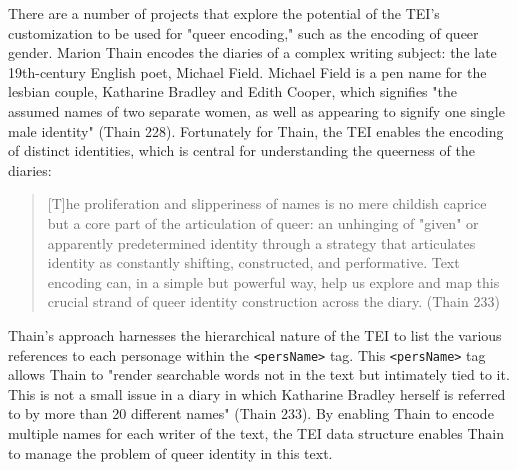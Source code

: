 \documentclass[11pt]{article}
\begin{document}
There are a number of projects that explore the potential of the TEI's
customization to be used for "queer encoding," such as the encoding of
queer gender. Marion Thain encodes the diaries of a complex writing
subject: the late 19th-century English poet, Michael Field. Michael
Field is a pen name for the lesbian couple, Katharine Bradley and
Edith Cooper, which signifies "the assumed names of two separate
women, as well as appearing to signify one single male identity"
(Thain 228). Fortunately for Thain, the TEI enables the encoding of
distinct identities, which is central for understanding the queerness
of the diaries:
\begin{quote}
[T]he proliferation and slipperiness of names is no mere childish
caprice but a core part of the articulation of queer: an unhinging of
"given" or apparently predetermined identity through a strategy that
articulates identity as constantly shifting, constructed, and
performative. Text encoding can, in a simple but powerful way, help us
explore and map this crucial strand of queer identity construction
across the diary. (Thain 233)
\end{quote}
Thain's approach harnesses the hierarchical nature of the TEI to list
the various references to each personage within the \texttt{<persName>} tag.
This \texttt{<persName>} tag allows Thain to "render searchable words not in
the text but intimately tied to it. This is not a small issue in a
diary in which Katharine Bradley herself is referred to by more than
20 different names" (Thain 233). By enabling Thain to encode multiple
names for each writer of the text, the TEI data structure enables
Thain to manage the problem of queer identity in this text.
\end{document}
